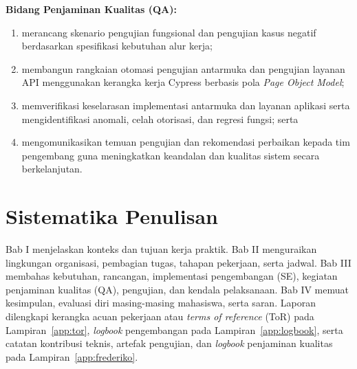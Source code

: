 \noindent\textbf{Bidang Penjaminan Kualitas (QA):}
\begin{enumerate}[label=\arabic*),resume]
\item merancang skenario pengujian fungsional dan pengujian kasus negatif berdasarkan spesifikasi kebutuhan alur kerja;
\item membangun rangkaian otomasi pengujian antarmuka dan pengujian layanan API menggunakan kerangka kerja Cypress berbasis pola \textit{Page Object Model};
\item memverifikasi keselarasan implementasi antarmuka dan layanan aplikasi serta mengidentifikasi anomali, celah otorisasi, dan regresi fungsi; serta
\item mengomunikasikan temuan pengujian dan rekomendasi perbaikan kepada tim pengembang guna meningkatkan keandalan dan kualitas sistem secara berkelanjutan.
\end{enumerate}

\section{Sistematika Penulisan}\label{sec:sistematika}
Bab I menjelaskan konteks dan tujuan kerja praktik. Bab II menguraikan lingkungan organisasi, pembagian tugas, tahapan pekerjaan, serta jadwal. Bab III membahas kebutuhan, rancangan, implementasi pengembangan (SE), kegiatan penjaminan kualitas (QA), pengujian, dan kendala pelaksanaan. Bab IV memuat kesimpulan, evaluasi diri masing-masing mahasiswa, serta saran. Laporan dilengkapi kerangka acuan pekerjaan atau \textit{terms of reference} (ToR) pada Lampiran~\ref{app:tor}, \textit{logbook} pengembangan pada Lampiran~\ref{app:logbook}, serta catatan kontribusi teknis, artefak pengujian, dan \textit{logbook} penjaminan kualitas pada Lampiran~\ref{app:frederiko}.
